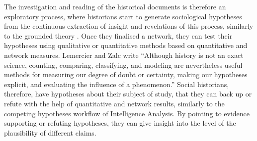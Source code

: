 The investigation and reading of the historical documents is therefore an exploratory process, where historians start to generate sociological hypotheses from the continuous extraction of insight and revelations of this process, similarly to the grounded theory \cite{glaserDiscoveryGroundedTheory2010}.
Once they finalised a network, they can test their hypotheses using qualitative or quantitative methods based on quantitative and network measures.
Lemercier and Zalc write ``Although history is not an exact science, counting, comparing, classifying, and modeling are nevertheless useful methods for measuring our degree of doubt or certainty, making our hypotheses explicit, and evaluating the influence of a phenomenon.''\cite{lemercierQuantitativeMethodsHumanities2019}
Social historians, therefore, have hypotheses about their subject of study, that they can back up or refute with the help of quantitative and network results, similarly to the competing hypotheses workflow of Intelligence Analysis\cite{dhamiAnalysisCompetingHypotheses2019}.
By pointing to evidence supporting or refuting hypotheses, they can give insight into the level of the plausibility of different claims.





